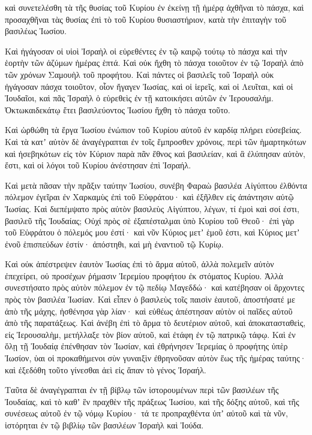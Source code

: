 {καὶ συνετελέσθη τὰ τῆς θυσίας τοῦ Κυρίου ἐν ἐκείνῃ τῇ ἡμέρᾳ ἀχθῆναι τὸ πάσχα,
καὶ προσαχθῆναι τὰς θυσίας ἐπὶ τὸ τοῦ Κυρίου θυσιαστήριον, κατὰ τὴν ἐπιταγὴν τοῦ βασιλέως Ἰωσίου.
\par }{\PP {}Καὶ ἠγάγοσαν οἱ υἱοὶ Ἰσραὴλ οἱ εὑρεθέντες ἐν τῷ καιρῷ τούτῳ τὸ πάσχα καὶ τὴν ἑορτὴν τῶν ἀζύμων ἡμέρας ἑπτά.
Καὶ οὐκ ἤχθη τὸ πάσχα τοιοῦτον ἐν τῷ Ἰσραὴλ ἀπὸ τῶν χρόνων Σαμουὴλ τοῦ προφήτου.
Καὶ πάντες οἱ βασιλεῖς τοῦ Ἰσραὴλ οὐκ ἠγάγοσαν πάσχα τοιοῦτον, οἷον ἤγαγεν Ἰωσίας, καὶ οἱ ἱερεῖς, καὶ οἱ Λευῖται, καὶ οἱ Ἰουδαῖοι, καὶ πᾶς Ἰσραὴλ ὁ εὑρεθεὶς ἐν τῇ κατοικήσει αὐτῶν ἐν Ἱερουσαλήμ.
Ὀκτωκαιδεκάτῳ ἔτει βασιλεύοντος Ἰωσίου ἤχθη τὸ πάσχα τοῦτο.
\par }{\PP {}Καὶ ὠρθώθη τὰ ἔργα Ἰωσίου ἐνώπιον τοῦ Κυρίου αὐτοῦ ἐν καρδίᾳ πλήρει εὐσεβείας.
Καὶ τὰ κατʼ αὐτὸν δὲ ἀναγέγραπται ἐν τοῖς ἔμπροσθεν χρόνοις, περὶ τῶν ἡμαρτηκότων καὶ ἠσεβηκότων εἰς τὸν Κύριον παρὰ πᾶν ἔθνος καὶ βασιλείαν, καὶ ἃ ἐλύπησαν αὐτὸν, ἔστι, καὶ οἱ λόγοι τοῦ Κυρίου ἀνέστησαν ἐπὶ Ἰσραήλ.
\par }{\PP {}Καὶ μετὰ πᾶσαν τὴν πρᾶξιν ταύτην Ἰωσίου, συνέβη Φαραὼ βασιλέα Αἰγύπτου ἐλθόντα πόλεμον ἐγεῖραι ἐν Χαρκαμὺς ἐπὶ τοῦ Εὐφράτου· καὶ ἐξῆλθεν εἰς ἀπάντησιν αὐτῷ Ἰωσίας.
Καὶ διεπέμψατο πρὸς αὐτὸν βασιλεὺς Αἰγύπτου, λέγων, τί ἐμοὶ καὶ σοί ἐστι, βασιλεῦ τῆς Ἰουδαίας;
Οὐχί πρὸς σὲ ἐξαπέσταλμαι ὑπὸ Κυρίου τοῦ Θεοῦ· ἐπὶ γὰρ τοῦ Εὐφράτου ὁ πόλεμός μου ἐστί· καὶ νῦν Κύριος μετʼ ἑμοῦ ἐστι, καὶ Κύριος μετʼ ἐνοῦ ἑπισπεύδων ἐστίν· ἀπόστηθι, καὶ μὴ ἐναντιοῦ τῷ Κυρίῳ.
\par }{\PP {}Καὶ οὐκ ἀπέστρεψεν ἑαυτὸν Ἰωσίας ἐπὶ τὸ ἅρμα αὐτοῦ, ἀλλὰ πολεμεῖν αὐτὸν ἐπεχείρει, οὐ προσέχων ῥήμασιν Ἰερεμίου προφήτου ἐκ στόματος Κυρίου.
Ἀλλὰ συνεστήσατο πρὸς αὐτὸν πόλεμον ἐν τῷ πεδίῳ Μαγεδδώ· καὶ κατέβησαν οἱ ἄρχοντες πρὸς τὸν βασιλέα Ἰωσίαν.
Καὶ εἶπεν ὁ βασιλεὺς τοῖς παισὶν ἑαυτοῦ, ἀποστήσατέ με ἀπὸ τῆς μάχης, ἠσθένησα γὰρ λίαν· καὶ εὐθέως ἀπέστησαν αὐτὸν οἱ παῖδες αὐτοῦ ἀπὸ τῆς παρατάξεως.
Καὶ ἀνέβη ἐπὶ τὸ ἅρμα τὸ δευτέριον αὐτοῦ, καὶ ἀποκατασταθεὶς, εἰς Ἰερουσαλὴμ, μετήλλαξε τὸν βίον αὐτοῦ, καὶ ἐτάφη ἐν τῷ πατρικῷ τάφῳ.
Καὶ ἐν ὅλῃ τῇ Ἰουδαίᾳ ἐπένθησαν τὸν Ἰωσίαν, καὶ ἐθρήνησεν Ἱερεμίας ὁ προφήτης ὑπὲρ Ἰωσίον, ὑαι οἱ προκαθήμενοι σὺν γυναιξὶν ἐθρηνοῦσαν αὐτὸν ἕως τῆς ἡμέρας ταύτης· καὶ ἐξεδόθη τοῦτο γίνεσθαι ἀεὶ εἰς ἅπαν τὸ γένος Ἰσραήλ.
\par }{\PP {}Ταῦτα δὲ ἀναγέγραπται ἐν τῇ βίβλῳ τῶν ἱστορουμένων περὶ τῶν βασιλέων τῆς Ἰουδαίας, καὶ τὸ καθʼ ἓν πραχθὲν τῆς πράξεως Ἰωσίου, καὶ τῆς δόξης αὐτοῦ, καὶ τῆς συνέσεως αὐτοῦ ἐν τῷ νόμῳ Κυρίου· τά τε προπραχθέντα ὑπʼ αὐτοῦ καὶ τὰ νῦν, ἱστόρηται ἐν τῷ βιβλίῳ τῶν βασιλέων Ἰσραὴλ καὶ Ἰούδα.
}
